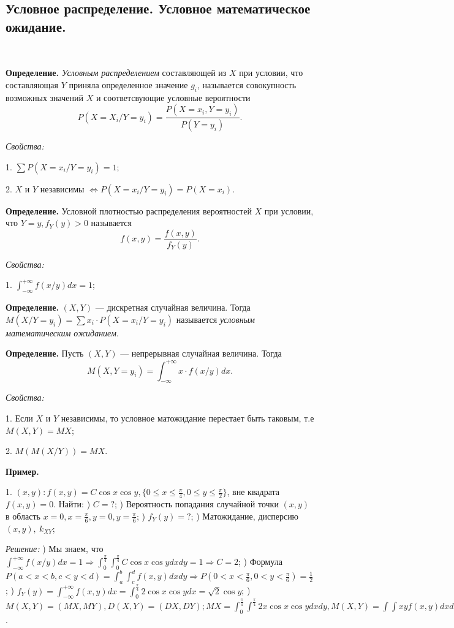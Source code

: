 \documentclass[9pt]{article}
\begin{document}
\subsection{Условное распределение. Условное математическое ожидание.}

\ 
\par\textbf{Определение.} \textit{Условным распределением} составляющей из \(X\) при условии, что составляющая \(Y\) приняла определенное значение \(g_i\), называется совокупность возможных значений \(X\) и соответсвующие условные вероятности
\[P(X=X_i/Y=y_i)=\dfrac{P(X=x_i,Y=y_i)}{P(Y=y_i)}.\]
\par\textit{Свойства:}
\par1. \(\sum P(X=x_i/Y=y_i)=1\);
\par2. \(X\) и \(Y\) независимы \(\Leftrightarrow P(X=x_i/Y=y_i)=P(X=x_i)\).
\par\textbf{Определение.} Условной плотностью распределения вероятностей \(X\) при условии, что \(Y=y,f_Y(y)>0\) называется \[f(x,y)=\dfrac{f(x,y)}{f_Y(y)}.\]
\par\textit{Свойства:}
\par1. \(\int_{-\infty}^{+\infty}f(x/y)dx=1\);
\par\textbf{Определение.} \((X,Y)\) --- дискретная случайная величина. Тогда \(M(X/Y=y_i)=\sum x_i\cdot P(X=x_i/Y=y_i)\) называется \textit{условным математическим ожиданием}.
\par\textbf{Определение.} Пусть \((X,Y)\) --- непрерывная случайная величина. Тогда \[M(X,Y=y_i)=\int_{-\infty}^{+\infty}x\cdot f(x/y)dx.\]
\par\textit{Свойства:}
\par1. Если \(X\) и \(Y\) независимы, то условное матожидание перестает быть таковым, т.е \(M(X,Y)=MX\);
\par2. \(M(M(X/Y))=MX\).

\par\textbf{Пример.}
\par1. \((x,y):f(x,y)=C\cos x\cos y,\{0\le x\le \frac{\pi}{4}, 0\le y\le \frac{\pi}{2}\}\), вне квадрата \(f(x,y)=0\). Найти:
\parа) \(C=?\);
) Вероятность попадания случайной точки \((x,y)\) в область \(x=0,x=\frac{\pi}{6},y=0,y=\frac{\pi}{6}\);
\parв) \(f_Y(y)=?\);
) Матожидание, дисперсию \((x,y),\ k_{XY}\);
\par\textit{Решение:}
) Мы знаем, что \(\int_{-\infty}^{+\infty}f(x/y)dx=1\Rightarrow \int_0^{\frac{\pi}{4}}\int_0^{\frac{\pi}{4}}C\cos x\cos ydxdy=1\Rightarrow C=2\);
\parб) Формула \(P(a<x<b,c<y<d)=\int_a^b\int_c^df(x,y)dxdy\Rightarrow P(0<x<\frac{\pi}{6},0<y<\frac{\pi}{6})=\frac{1}{2}\);
\parв) \(f_Y(y)=\int_{-\infty}^{+\infty}f(x,y)dx=\int_0^\frac{\pi}{4}2\cos x\cos ydx = \sqrt2\cos y\);
\parг) \(M(X,Y)=(MX,MY), D(X,Y)=(DX,DY); MX=\int_0^\frac{\pi}{4}\int^\frac{\pi}{4}2x\cos x\cos ydxdy, M(X,Y)=\int\int xyf(x,y)dxdy\).
\end{document}
